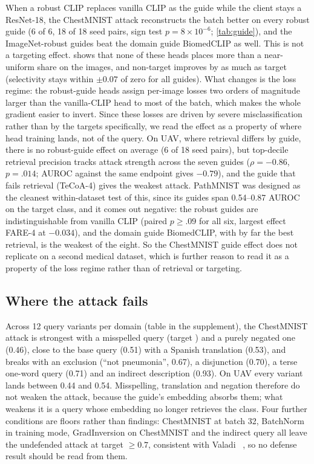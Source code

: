 When a robust CLIP replaces vanilla CLIP as the guide while the client stays a ResNet-18, the ChestMNIST attack reconstructs the batch better on every robust guide (6 of 6, 18 of 18 seed pairs, sign test $p=8\times10^{-6}$; \cref{tab:guide}), and the ImageNet-robust guides beat the domain guide BiomedCLIP as well.
This is not a targeting effect.  shows that none of these heads places more than a near-uniform share on the \pneu images, and non-target \lpips improves by as much as target \lpips (selectivity stays within $\pm0.07$ of zero for all guides).
What changes is the loss regime: the robust-guide heads assign per-image losses two orders of magnitude larger than the vanilla-CLIP head to most of the batch, which makes the whole gradient easier to invert. Since these losses are driven by severe misclassification rather than by the targets specifically, we read the effect as a property of where head training lands, not of the query.
On UAV, where retrieval differs by guide, there is no robust-guide effect on average (6 of 18 seed pairs), but top-decile retrieval precision tracks attack strength across the seven guides ($\rho=-0.86$, $p=.014$; AUROC against the same endpoint gives $-0.79$), and the guide that fails retrieval (TeCoA-4) gives the weakest attack.
PathMNIST was designed as the cleanest within-dataset test of this, since its guides span 0.54--0.87 AUROC on the target class, and it comes out negative: the robust guides are indistinguishable from vanilla CLIP (paired $p\ge.09$ for all six, largest effect FARE-4 at $-0.034$), and the domain guide BiomedCLIP, with by far the best retrieval, is the weakest of the eight.
So the ChestMNIST guide effect does not replicate on a second medical dataset, which is further reason to read it as a property of the loss regime rather than of retrieval or targeting.

\subsection{Where the attack fails}
\label{sec:failure}

Across 12 query variants per domain (table in the supplement), the ChestMNIST attack is strongest with a misspelled query (target ) and a purely negated one (0.46), close to the base query (0.51) with a Spanish translation (0.53), and breaks with an exclusion (``not pneumonia'', 0.67), a disjunction (0.70), a terse one-word query (0.71) and an indirect description (0.93).
On UAV every variant lands between 0.44 and 0.54.
Misspelling, translation and negation therefore do not weaken the attack, because the guide's embedding absorbs them; what weakens it is a query whose embedding no longer retrieves the class.
Four further conditions are floors rather than findings: ChestMNIST at batch 32, BatchNorm in training mode, GradInversion on ChestMNIST and the indirect query all leave the undefended attack at target \lpips $\ge0.7$, consistent with Valadi \etal~\cite{valadi2025feasibility}, so no defense result should be read from them.
